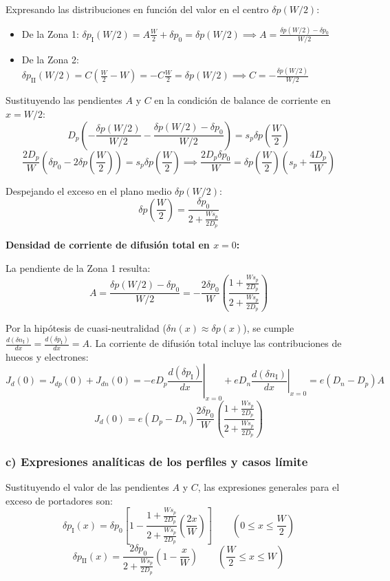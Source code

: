 \begin{problema}
Expresando las distribuciones en función del valor en el centro $\delta p(W/2)$:
\begin{itemize}
    \item De la Zona 1: $\delta p_{\text{I}}(W/2) = A \frac{W}{2} + \delta p_0 = \delta p(W/2) \implies A = \frac{\delta p(W/2) - \delta p_0}{W/2}$
    \item De la Zona 2: $\delta p_{\text{II}}(W/2) = C \left(\frac{W}{2} - W\right) = -C \frac{W}{2} = \delta p(W/2) \implies C = -\frac{\delta p(W/2)}{W/2}$
\end{itemize}

Sustituyendo las pendientes $A$ y $C$ en la condición de balance de corriente en $x = W/2$:
\[
D_p \left( -\frac{\delta p(W/2)}{W/2} - \frac{\delta p(W/2) - \delta p_0}{W/2} \right) = s_p \delta p\left(\frac{W}{2}\right)
\]
\[
\frac{2 D_p}{W} \left( \delta p_0 - 2 \delta p\left(\frac{W}{2}\right) \right) = s_p \delta p\left(\frac{W}{2}\right) \implies \frac{2 D_p \delta p_0}{W} = \delta p\left(\frac{W}{2}\right) \left( s_p + \frac{4 D_p}{W} \right)
\]

Despejando el exceso en el plano medio $\delta p(W/2)$:
\[
\delta p\left(\frac{W}{2}\right) = \frac{\delta p_0}{2 + \frac{W s_p}{2 D_p}}
\]

\textbf{Densidad de corriente de difusión total en $x = 0$:}

La pendiente de la Zona 1 resulta:
\[
A = \frac{\delta p(W/2) - \delta p_0}{W/2} = -\frac{2 \delta p_0}{W} \left( \frac{1 + \frac{W s_p}{2 D_p}}{2 + \frac{W s_p}{2 D_p}} \right)
\]

Por la hipótesis de cuasi-neutralidad ($\delta n(x) \approx \delta p(x)$), se cumple $\frac{d(\delta n_{\text{I}})}{dx} = \frac{d(\delta p_{\text{I}})}{dx} = A$. La corriente de difusión total incluye las contribuciones de huecos y electrones:
\[
J_d(0) = J_{dp}(0) + J_{dn}(0) = -e D_p \left.\frac{d(\delta p_{\text{I}})}{dx}\right|_{x=0} + e D_n \left.\frac{d(\delta n_{\text{I}})}{dx}\right|_{x=0} = e (D_n - D_p) A
\]
\[
J_d(0) = e (D_p - D_n) \frac{2 \delta p_0}{W} \left( \frac{1 + \frac{W s_p}{2 D_p}}{2 + \frac{W s_p}{2 D_p}} \right)
\]

\subsubsection*{c) Expresiones analíticas de los perfiles y casos límite}

Sustituyendo el valor de las pendientes $A$ y $C$, las expresiones generales para el exceso de portadores son:
\[
\delta p_{\text{I}}(x) = \delta p_0 \left[ 1 - \frac{1 + \frac{W s_p}{2 D_p}}{2 + \frac{W s_p}{2 D_p}} \left(\frac{2x}{W}\right) \right] \qquad \left(0 \le x \le \frac{W}{2}\right)
\]
\[
\delta p_{\text{II}}(x) = \frac{2 \delta p_0}{2 + \frac{W s_p}{2 D_p}} \left(1 - \frac{x}{W}\right) \qquad \left(\frac{W}{2} \le x \le W\right)
\]


\end{problema}
